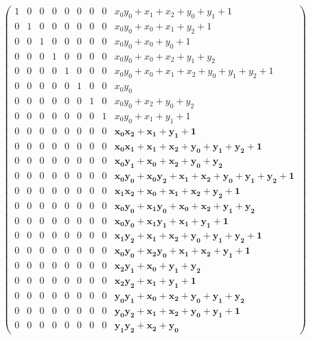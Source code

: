 \documentclass[9pt]{beamer}
\begin{document}
\begin{frame}
\begin{scriptsize}
\begin{align*}
\left(\begin{array}{rrrrrrrrr}
1 & 0 & 0 & 0 & 0 & 0 & 0 & 0 & x_{0} y_{0} + x_{1} + x_{2} + y_{0} + y_{1} + 1\\
0 & 1 & 0 & 0 & 0 & 0 & 0 & 0 & x_{0} y_{0} + x_{0} + x_{1} + y_{2} + 1 \\
0 & 0 & 1 & 0 & 0 & 0 & 0 & 0 & x_{0} y_{0} + x_{0} + y_{0} + 1 \\
0 & 0 & 0 & 1 & 0 & 0 & 0 & 0 & x_{0} y_{0} + x_{0} + x_{2} + y_{1} + y_{2} \\
0 & 0 & 0 & 0 & 1 & 0 & 0 & 0 & x_{0} y_{0} + x_{0} + x_{1} + x_{2} + y_{0} + y_{1} + y_{2} + 1 \\
0 & 0 & 0 & 0 & 0 & 1 & 0 & 0 & x_{0} y_{0} \\
0 & 0 & 0 & 0 & 0 & 0 & 1 & 0 & x_{0} y_{0} + x_{2} + y_{0} + y_{2} \\
0 & 0 & 0 & 0 & 0 & 0 & 0 & 1 & x_{0} y_{0} + x_{1} + y_{1} + 1 \\
0 & 0 & 0 & 0 & 0 & 0 & 0 & 0 & \mathbf{x_{0} x_{2} + x_{1} + y_{1} + 1} \\
0 & 0 & 0 & 0 & 0 & 0 & 0 & 0 & \mathbf{x_{0} x_{1} + x_{1} + x_{2} + y_{0} + y_{1} + y_{2} + 1} \\
0 & 0 & 0 & 0 & 0 & 0 & 0 & 0 & \mathbf{x_{0} y_{1} + x_{0} + x_{2} + y_{0} + y_{2}} \\
0 & 0 & 0 & 0 & 0 & 0 & 0 & 0 & \mathbf{x_{0} y_{0} + x_{0} y_{2} + x_{1} + x_{2} + y_{0} + y_{1} + y_{2} + 1} \\
0 & 0 & 0 & 0 & 0 & 0 & 0 & 0 & \mathbf{x_{1} x_{2} + x_{0} + x_{1} + x_{2} + y_{2} + 1} \\
0 & 0 & 0 & 0 & 0 & 0 & 0 & 0 & \mathbf{x_{0} y_{0} + x_{1} y_{0} + x_{0} + x_{2} + y_{1} + y_{2}} \\
0 & 0 & 0 & 0 & 0 & 0 & 0 & 0 & \mathbf{x_{0} y_{0} + x_{1} y_{1} + x_{1} + y_{1} + 1} \\
0 & 0 & 0 & 0 & 0 & 0 & 0 & 0 & \mathbf{x_{1} y_{2} + x_{1} + x_{2} + y_{0} + y_{1} + y_{2} + 1} \\
0 & 0 & 0 & 0 & 0 & 0 & 0 & 0 & \mathbf{x_{0} y_{0} + x_{2} y_{0} + x_{1} + x_{2} + y_{1} + 1} \\
0 & 0 & 0 & 0 & 0 & 0 & 0 & 0 & \mathbf{x_{2} y_{1} + x_{0} + y_{1} + y_{2}} \\
0 & 0 & 0 & 0 & 0 & 0 & 0 & 0 & \mathbf{x_{2} y_{2} + x_{1} + y_{1} + 1} \\
0 & 0 & 0 & 0 & 0 & 0 & 0 & 0 & \mathbf{y_{0} y_{1} + x_{0} + x_{2} + y_{0} + y_{1} + y_{2}} \\
0 & 0 & 0 & 0 & 0 & 0 & 0 & 0 & \mathbf{y_{0} y_{2} + x_{1} + x_{2} + y_{0} + y_{1} + 1} \\
0 & 0 & 0 & 0 & 0 & 0 & 0 & 0 & \mathbf{y_{1} y_{2} + x_{2} + y_{0}}
\end{array}\right)              
\end{align*}
\end{scriptsize}



\end{frame}
\end{document}
